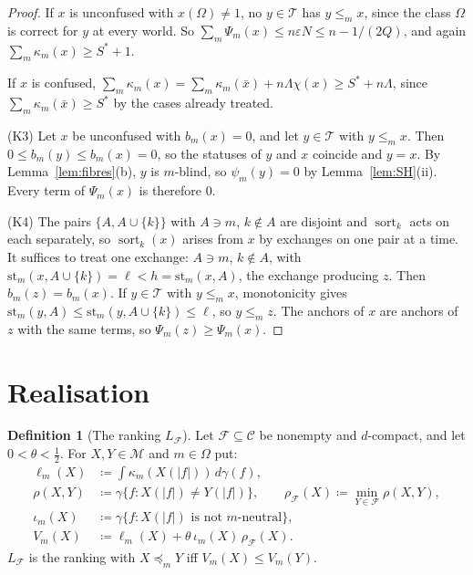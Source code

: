 \documentclass[11pt]{article}
\newcommand{\chg}[1]{{\color{red}#1}}
\theoremstyle{definition}
\newtheorem{definition}[theorem]{Definition}
\theoremstyle{remark}
\newcommand{\M}{\mathcal M}
\newcommand{\C}{\mathcal C}
\newcommand{\T}{\mathcal T}
\newcommand{\F}{\mathcal F}
\begin{document}
\begin{proof}
If $x$ is unconfused with $x(\Omega)\neq1$, no $y\in\T$ has $y\le_mx$, since the class $\Omega$ is correct for $y$ at every world. So $\sum_m\Psi_m(x)\le n\varepsilon N\le n-1/(2Q)$\chg{, and again $\sum_m\kappa_m(x)\ge S^\ast+1$}.

If $x$ is confused, $\sum_m\kappa_m(x)=\sum_m\kappa_m(\bar x)+n\Lambda\chi(x)\ge S^\ast+n\Lambda$\chg{, since $\sum_m\kappa_m(\bar x)\ge S^\ast$ by the cases already treated}.

(K3) Let \chg{$x$ be unconfused with} $b_m(x)=0$, and let $y\in\T$ with $y\le_mx$. Then $0\le b_m(y)\le b_m(x)=0$, so the statuses of $y$ and $x$ coincide and $y=x$. By Lemma~\ref{lem:fibres}(b), $y$ is $m$-blind, so $\psi_m(y)=0$ by Lemma~\ref{lem:SH}(ii). Every term of $\Psi_m(x)$ is therefore $0$.

(K4) \chg{The pairs $\{A,A\cup\{k\}\}$ with $A\ni m$, $k\notin A$ are disjoint and $\operatorname{sort}_k$ acts on each separately, so $\operatorname{sort}_k(x)$ arises from $x$ by exchanges on one pair at a time.} It suffices to treat one exchange: $A\ni m$, $k\notin A$, with $\mathrm{st}_m(x,A\cup\{k\})=\ell<h=\mathrm{st}_m(x,A)$, the exchange producing $z$. Then $b_m(z)=b_m(x)$. If $y\in\T$ with $y\le_mx$, monotonicity gives $\mathrm{st}_m(y,A)\le\mathrm{st}_m(y,A\cup\{k\})\le\ell$, so $y\le_mz$. The anchors of $x$ are anchors of $z$ with the same terms, so $\Psi_m(z)\ge\Psi_m(x)$.
\end{proof}

\section{Realisation}\label{sec:realisation}

\begin{definition}[The ranking $L_\F$]\label{def:witness}
Let $\F\subseteq\C$ be nonempty and $d$-compact, and let $0<\theta<\tfrac12$. For $X,Y\in\M$ and $m\in\Omega$ put:
\begin{align*}
\ell_m(X)&\coloneqq\int\kappa_m(X(|f|))\,d\gamma(f),\\
\rho(X,Y)&\coloneqq\gamma\{f:X(|f|)\neq Y(|f|)\},\qquad\rho_\F(X)\coloneqq\min_{Y\in\F}\rho(X,Y),\\
\iota_m(X)&\coloneqq\gamma\{f:X(|f|)\text{ is not $m$-neutral}\},\\
V_m(X)&\coloneqq\ell_m(X)+\theta\,\iota_m(X)\,\rho_\F(X).
\end{align*}
$L_\F$ is the ranking with $X\preceq_mY$ iff $V_m(X)\le V_m(Y)$.
\end{definition}
\end{document}
